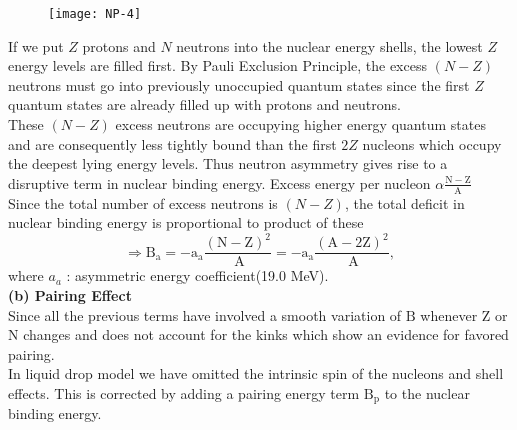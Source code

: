 \begin{figure}[H]
	\centering
	\texttt{[image: NP-4]}
	\caption{}
	\label{}
\end{figure}
If we put $Z$ protons and $N$ neutrons into the nuclear energy shells, the lowest $Z$ energy levels are filled first. By Pauli Exclusion Principle, the excess $(N-Z)$ neutrons must go into previously unoccupied quantum states since the first $Z$ quantum states are already filled up with protons and neutrons.\\
These $(N-Z)$ excess neutrons are occupying higher energy quantum states and are consequently less tightly bound than the first $2 Z$ nucleons which occupy the deepest lying energy levels. Thus neutron asymmetry gives rise to a disruptive term in nuclear binding energy. Excess energy per nucleon $\alpha \frac{\mathrm{N}-\mathrm{Z}}{\mathrm{A}}$\\
Since the total number of excess neutrons is $(N-Z)$, the total deficit in nuclear binding energy is proportional to product of these\\
$$
\Rightarrow \mathrm{B}_{\mathrm{a}}=-\mathrm{a}_{\mathrm{a}} \frac{(\mathrm{N}-\mathrm{Z})^2}{\mathrm{~A}}=-\mathrm{a}_{\mathrm{a}} \frac{(\mathrm{A}-2 \mathrm{Z})^2}{\mathrm{~A}},
$$
where $a_a$ : asymmetric energy coefficient(19.0 MeV).\\
\textbf{(b) Pairing Effect}\\
Since all the previous terms have involved a smooth variation of $\mathrm{B}$ whenever $\mathrm{Z}$ or $\mathrm{N}$ changes and does not account for the kinks which show an evidence for favored pairing.\\
In liquid drop model we have omitted the intrinsic spin of the nucleons and shell effects. This is corrected by adding a pairing energy term $\mathrm{B}_{\mathrm{p}}$ to the nuclear binding energy.
